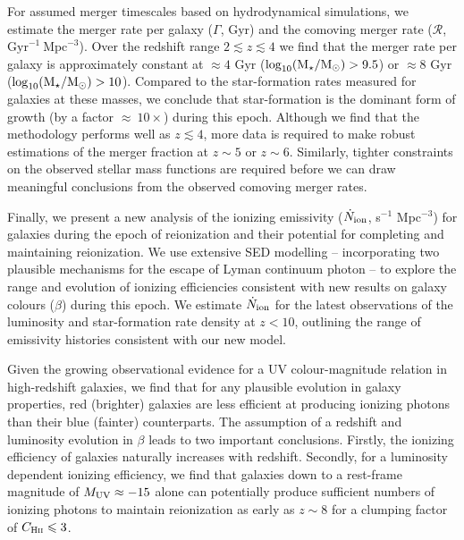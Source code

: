 For assumed merger timescales based on hydrodynamical simulations, we estimate the merger rate per galaxy ($\Gamma$, Gyr) and the comoving merger rate ($\mathcal{R}$, $\text{Gyr}^{-1}~\text{Mpc}^{-3}$). Over the redshift range $2 \lesssim z \lesssim 4$ we find that the merger rate per galaxy is approximately constant at $\approx 4$ Gyr ($\log_{10}(\Mstar/\text{M}_{\odot}) > 9.5$) or $\approx 8$ Gyr ($\log_{10}(\Mstar/\text{M}_{\odot}) > 10$). Compared to the star-formation rates measured for galaxies at these masses, we conclude that star-formation is the dominant form of growth (by a factor $\approx ~10\times$) during this epoch. Although we find that the methodology performs well as $z\lesssim 4$, more data is required to make robust estimations of the merger fraction at $z\sim5$ or $z\sim6$. Similarly, tighter constraints on the observed stellar mass functions are required before we can draw meaningful conclusions from the observed comoving merger rates.

Finally, we present a new analysis of the ionizing emissivity ($\dot{N}_{\rm{ion}}$, s$^{-1}$ Mpc$^{-3}$) for galaxies during the epoch of reionization and their potential for completing and maintaining reionization. We use extensive SED modelling -- incorporating two plausible mechanisms for the escape of Lyman continuum photon -- to explore the range and evolution of ionizing efficiencies consistent with new results on galaxy colours ($\beta$) during this epoch. We estimate $\dot{N}_{\rm{ion}}$ for the latest observations of the luminosity and star-formation rate density at $z<10$, outlining the range of emissivity histories consistent with our new model. 

Given the growing observational evidence for a UV colour-magnitude relation in high-redshift galaxies, we find that for any plausible evolution in galaxy properties, red (brighter) galaxies are less efficient at producing ionizing photons than their blue (fainter) counterparts. The assumption of a redshift and luminosity evolution in $\beta$ leads to two important conclusions. Firstly, the ionizing efficiency of galaxies naturally increases with redshift.
Secondly, for a luminosity dependent ionizing efficiency, we find that galaxies down to a rest-frame magnitude of $M_{\rm{UV}} \approx -15$ alone can potentially produce sufficient numbers of ionizing photons to maintain reionization as early as $z\sim8$ for a clumping factor of $C_{\textsc{Hii}} \leq 3$.





\clearpage




